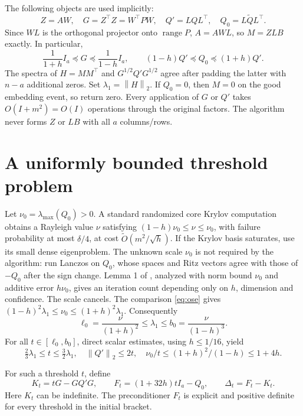 \documentclass[11pt]{article}
\newcommand{\norm}[1]{\left\lVert#1\right\rVert}
\newcommand{\tO}{\widetilde O}
\newcommand{\range}{\operatorname{range}}
\begin{document}
The following objects are used implicitly:
\[
 Z=AW,\quad G=Z^\top Z=W^\top P W,\quad
 Q'=LQL^\top,\quad Q_0=L\widetilde QL^\top.
\]
Since \(WL\) is the orthogonal projector onto \(\range P\),
\(A=AWL\), so \(M=ZLB\) exactly. In particular,
\[
 \frac1{1+h}I_a\preceq G\preceq\frac1{1-h}I_a,
 \qquad (1-h)Q'\preceq Q_0\preceq(1+h)Q'.
\]
The spectra of \(H=MM^\top\) and \(G^{1/2}Q'G^{1/2}\) agree
after padding the latter with \(n-a\) additional zeros.
Set \(\lambda_1=\norm H_2\).
If \(Q_0=0\), then \(M=0\) on the good embedding event, so return zero.
Every application of \(G\) or \(Q'\) takes \(O(I+m^2)=O(I)\)
operations through the original factors. The algorithm never forms \(Z\)
or \(LB\) with all \(a\) columns/rows.

\section{A uniformly bounded threshold problem}
Let \(\nu_0=\lambda_{\max}(Q_0)>0\). A standard randomized core
Krylov computation obtains a Rayleigh value \(\nu\) satisfying
\((1-h)\nu_0\leq\nu\leq\nu_0\), with failure probability at most
\(\delta/4\), at cost \(\tO(m^2/\sqrt h)\). If the Krylov basis
saturates, use its small dense eigenproblem.
The unknown scale \(\nu_0\) is not required by the algorithm: run Lanczos
on \(Q_0\), whose spaces and Ritz vectors agree with those of
\(-Q_0\) after the sign change. Lemma 1 of \cite{jyz}, analyzed with
norm bound \(\nu_0\) and additive error \(h\nu_0\), gives an iteration
count depending only on \(h\), dimension and confidence. The scale cancels.
The comparison \eqref{eq:ose} gives
\((1-h)^2\lambda_1\leq\nu_0\leq(1+h)^2\lambda_1\).
Consequently
\begin{equation}\label{eq:bracket}
 \ell_0=\frac{\nu}{(1+h)^2}\leq\lambda_1\leq
 b_0=\frac{\nu}{(1-h)^3}.
\end{equation}
For all \(t\in[\ell_0,b_0]\), direct scalar estimates, using
\(h\leq1/16\), yield
\[
 \tfrac23\lambda_1\leq t\leq\tfrac32\lambda_1,
 \quad \norm{Q'}_2\leq2t,
 \quad \nu_0/t\leq (1+h)^2/(1-h)\leq1+4h.
\]

For such a threshold \(t\), define
\begin{equation}\label{eq:stiffness}
 K_t=tG-GQ'G,\qquad
 F_t=(1+32h)tI_a-Q_0,\qquad
 \Delta_t=F_t-K_t.
\end{equation}
Here \(K_t\) can be indefinite. The preconditioner \(F_t\) is explicit
and positive definite for every threshold in the initial bracket.
\end{document}
